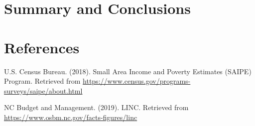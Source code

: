 \documentclass[12pt,]{article}
\begin{document}
\newpage

\section{Summary and Conclusions}\label{summary-and-conclusions}

\newpage

\section{References}\label{references}

U.S. Census Bureau. (2018). Small Area Income and Poverty Estimates
(SAIPE) Program. Retrieved from
\url{https://www.census.gov/programs-surveys/saipe/about.html}

NC Budget and Management. (2019). LINC. Retrieved from
\url{https://www.osbm.nc.gov/facts-figures/linc}
\end{document}
